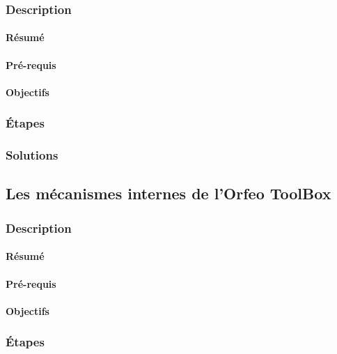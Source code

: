 \documentclass[a4paper,11pt,twoside,openright]{article}
\begin{document}
\subsubsection{Description}
\label{sec-2-2-1}
\paragraph{Résumé}
\label{sec-2-2-1-1}

\paragraph{Pré-requis}
\label{sec-2-2-1-2}


\paragraph{Objectifs}
\label{sec-2-2-1-3}

\subsubsection{Étapes}
\label{sec-2-2-2}

\subsubsection{Solutions}
\label{sec-2-2-3}
\subsection{Les mécanismes internes de l'\textbf{Orfeo ToolBox}}
\label{sec-2-3}
\subsubsection{Description}
\label{sec-2-3-1}
\paragraph{Résumé}
\label{sec-2-3-1-1}

\paragraph{Pré-requis}
\label{sec-2-3-1-2}


\paragraph{Objectifs}
\label{sec-2-3-1-3}

\subsubsection{Étapes}
\label{sec-2-3-2}
\end{document}
